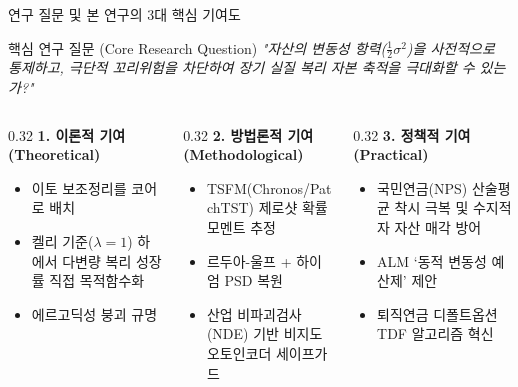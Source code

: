 \begin{frame}{연구 질문 및 본 연구의 3대 핵심 기여도}
\begin{block}{핵심 연구 질문 (Core Research Question)}
  \centering
  \large \textit{"자산의 변동성 항력($\frac{1}{2}\sigma^2$)을 사전적으로 통제하고, 극단적 꼬리위험을 차단하여 장기 실질 복리 자본 축적을 극대화할 수 있는가?"}
\end{block}

\vspace{3mm}

\begin{columns}[T]
  \begin{column}{0.32\textwidth}
    \textbf{1. 이론적 기여 (Theoretical)}
    \begin{itemize}
      \setlength{\itemsep}{3pt}
      \small
      \item 이토 보조정리를 코어로 배치
      \item 켈리 기준($\lambda=1$) 하에서 다변량 복리 성장률 직접 목적함수화
      \item 에르고딕성 붕괴 규명
    \end{itemize}
  \end{column}
  
  \begin{column}{0.32\textwidth}
    \textbf{2. 방법론적 기여 (Methodological)}
    \begin{itemize}
      \setlength{\itemsep}{3pt}
      \small
      \item TSFM(Chronos/PatchTST) 제로샷 확률 모멘트 추정
      \item 르두아-울프 + 하이엄 PSD 복원
      \item 산업 비파괴검사(NDE) 기반 비지도 오토인코더 세이프가드
    \end{itemize}
  \end{column}
  
  \begin{column}{0.32\textwidth}
    \textbf{3. 정책적 기여 (Practical)}
    \begin{itemize}
      \setlength{\itemsep}{3pt}
      \small
      \item 국민연금(NPS) 산술평균 착시 극복 및 수지적자 자산 매각 방어
      \item ALM `동적 변동성 예산제' 제안
      \item 퇴직연금 디폴트옵션 TDF 알고리즘 혁신
    \end{itemize}
  \end{column}
\end{columns}
\end{frame}
